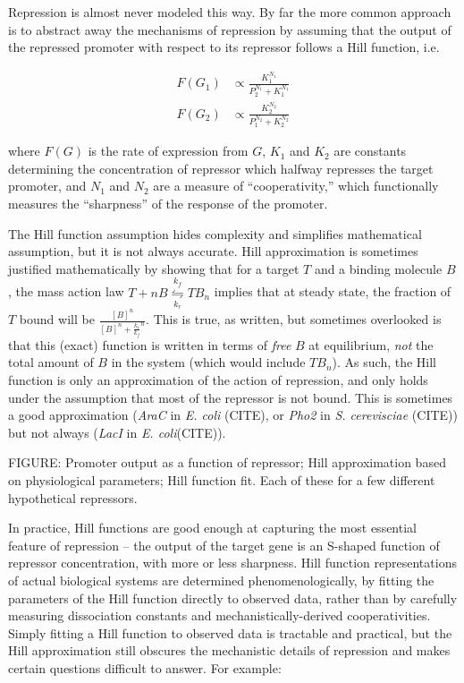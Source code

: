 \documentclass[preprint,12pt]{elsarticle}
\begin{document}
Repression is almost never modeled this way. By far the more common approach is to abstract away the mechanisms of repression by assuming that the output of the repressed promoter with respect to its repressor follows a Hill function, i.e.

\begin{align}
	F(G_1) &\propto \frac{K_1^{N_1}}{P_2^{N_1} + K_1^{N_1}}\\
	F(G_2) &\propto \frac{K_2^{N_2}}{P_1^{N_2} + K_2^{N_2}}
\end{align}

where $F(G)$ is the rate of expression from $G$, $K_1$ and $K_2$ are constants determining the concentration of repressor which halfway represses the target promoter, and $N_1$ and $N_2$ are a measure of ``cooperativity,'' which functionally measures the ``sharpness'' of the response of the promoter. 

The Hill function assumption hides complexity and simplifies mathematical assumption, but it is not always accurate. Hill approximation is sometimes justified mathematically by showing that for a target $T$ and a binding molecule $B$, the mass action law $T + nB \underset{k_r}{\overset{k_f}{\leftrightharpoons}} TB_n$ implies that at steady state, the fraction of $T$ bound will be $\frac{[B]^n}{[B]^n + \frac{k_r}{k_f}^n}$. This is true, as written, but sometimes overlooked is that this (exact) function is written in terms of \emph{free} $B$ at equilibrium, \emph{not} the total amount of $B$ in the system (which would include $TB_n$). As such, the Hill function is only an approximation of the action of repression, and only holds under the assumption that most of the repressor is not bound. This is sometimes a good approximation (\emph{AraC} in \emph{E. coli} (CITE), or \emph{Pho2} in \emph{S. cerevisciae} (CITE)) but not always (\emph{LacI} in \emph{E. coli}(CITE)). 

\vspace{.5in}
FIGURE: Promoter output as a function of repressor; Hill approximation based on physiological parameters; Hill function fit. Each of these for a few different hypothetical repressors.
\vspace{.5in}

In practice, Hill functions are good enough at capturing the most essential feature of repression -- the output of the target gene is an S-shaped function of repressor concentration, with more or less sharpness. Hill function representations of actual biological systems are determined phenomenologically, by fitting the parameters of the Hill function directly to observed data, rather than by carefully measuring dissociation constants and mechanistically-derived cooperativities. Simply fitting a Hill function to observed data is tractable and practical, but the Hill approximation still obscures the mechanistic details of repression and makes certain questions difficult to answer. For example:
\end{document}
